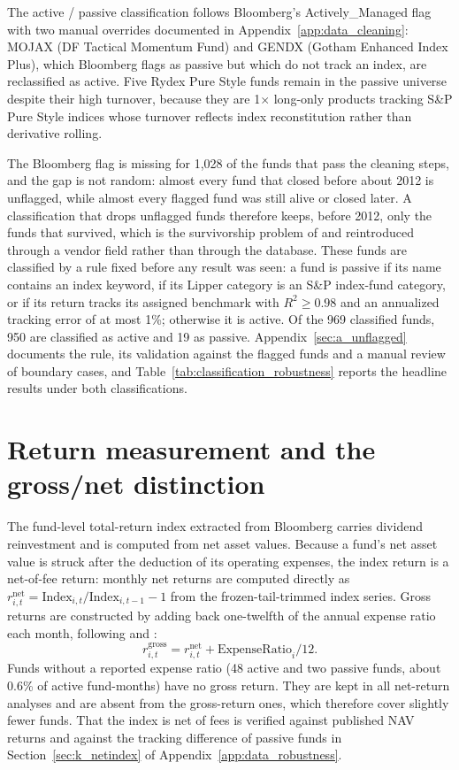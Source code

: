 \documentclass[12pt, oneside]{report}
\begin{document}
The active / passive classification follows Bloomberg's
Actively\_Managed flag with two manual overrides documented in
Appendix~\ref{app:data_cleaning}: MOJAX (DF Tactical Momentum Fund) and
GENDX (Gotham Enhanced Index Plus), which Bloomberg flags as passive but
which do not track an index, are reclassified as active. Five Rydex Pure
Style funds remain in the passive universe despite their high turnover,
because they are 1$\times$ long-only products tracking S\&P Pure Style
indices whose turnover reflects index reconstitution rather than
derivative rolling.

The Bloomberg flag is missing for 1{,}028 of the funds that pass the
cleaning steps, and the gap is
not random: almost every fund that closed before about 2012 is unflagged,
while almost every flagged fund was still alive or closed later. A
classification that drops unflagged funds therefore keeps, before 2012,
only the funds that survived, which is the survivorship problem of
\textcite{BrownGoetzmannIbbotsonRoss1992} and
\textcite{EltonGruberBlake1996} reintroduced through a vendor field
rather than through the database. These funds are classified by a rule
fixed before any result was seen: a fund is passive if its name contains
an index keyword, if its Lipper category is an S\&P index-fund category,
or if its return tracks its assigned benchmark with $R^2 \ge 0.98$ and an
annualized tracking error of at most 1\%; otherwise it is active. Of the
969 classified funds, 950 are classified as active and 19 as passive.
Appendix~\ref{sec:a_unflagged} documents the rule, its validation against
the flagged funds and a manual review of boundary cases, and
Table~\ref{tab:classification_robustness} reports the headline results
under both classifications.

\section{Return measurement and the gross/net distinction}
\label{sec:returns}

\noindent The fund-level total-return index extracted from Bloomberg
carries dividend reinvestment and is computed from net asset values. Because a fund's
net asset value is struck after the deduction of its operating expenses,
the index return is a net-of-fee return: monthly net returns are
computed directly as
$r^{\text{net}}_{i,t} = \text{Index}_{i,t} / \text{Index}_{i,t-1} - 1$
from the frozen-tail-trimmed index series. Gross returns are constructed
by adding back one-twelfth of the annual expense ratio each month,
following \textcite{FamaFrench2010} and
\textcite{BarrasScailletWermers2010}:
\begin{equation}
\label{eq:net_return}
r^{\text{gross}}_{i,t} = r^{\text{net}}_{i,t} + \text{ExpenseRatio}_i / 12.
\end{equation}
Funds without a reported expense ratio (48 active and two passive funds,
about 0.6\% of active fund-months) have no gross return. They are kept in
all net-return analyses and are absent from the gross-return ones, which
therefore cover slightly fewer funds.
That the index is net of fees is verified against published NAV returns
and against the tracking difference of passive funds in
Section~\ref{sec:k_netindex} of Appendix~\ref{app:data_robustness}.
\end{document}
